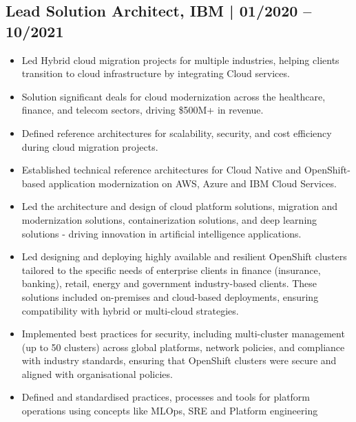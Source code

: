 \documentclass[12pt,]{scrartcl}
\begin{document}
\subsection*{Lead Solution Architect, IBM | 01/2020 -- 10/2021}
\begin{itemize}
    \item Led Hybrid cloud migration projects for multiple industries, helping clients transition to cloud infrastructure by integrating Cloud services.
    \item Solution significant deals for cloud modernization across the healthcare, finance, and telecom sectors, driving \$500M+ in revenue.
    \item Defined reference architectures for scalability, security, and cost efficiency during cloud migration projects.
    \item Established technical reference architectures for Cloud Native and OpenShift-based application modernization on AWS, Azure and IBM Cloud Services.
    \item Led the architecture and design of cloud platform solutions, migration and modernization solutions, containerization solutions, and deep learning solutions - driving innovation in artificial intelligence applications.
    
   \item Led designing and deploying highly available and resilient OpenShift clusters tailored to the specific needs of enterprise clients in finance (insurance, banking), retail, energy and government industry-based clients. These solutions included on-premises and cloud-based deployments, ensuring compatibility with hybrid or multi-cloud strategies.
   \item Implemented best practices for security, including multi-cluster management (up to 50 clusters) across global platforms, network policies, and compliance with industry standards, ensuring that OpenShift clusters were secure and aligned with organisational policies.
   \item Defined and standardised practices, processes and tools for platform operations using concepts like MLOps, SRE and Platform engineering
\end{itemize}
\end{document}
